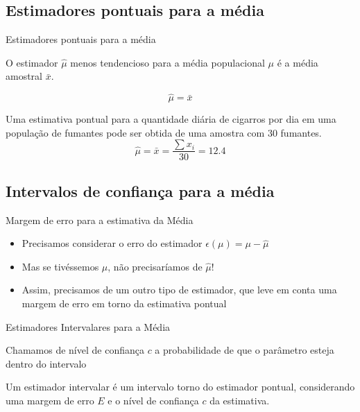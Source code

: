 \documentclass{beamer}
\begin{document}
\subsection{Estimadores pontuais para a média}

\begin{frame}{Estimadores pontuais para a média}
  \begin{block}{}
    O estimador $\hat{\mu}$ menos tendencioso para a média
    populacional $\mu$ é a média amostral $\bar{x}$.
  \end{block}
  \begin{displaymath}
    \hat{\mu} = \bar{x}
  \end{displaymath}
\end{frame}

\begin{frame}
  \begin{example}
    Uma estimativa pontual para a quantidade diária de cigarros por
    dia em uma população de fumantes pode ser obtida de uma amostra
    com 30 fumantes.
    \begin{displaymath}
      \hat{\mu} = \bar{x} = \frac{\sum x_i}{30} = 12.4
    \end{displaymath}
  \end{example}
\end{frame}

\subsection{Intervalos de confiança para a média}
\begin{frame}{Margem de erro para a estimativa da Média}
  \begin{itemize}
  \item Precisamos considerar o erro do estimador $\epsilon(\mu) =
    \mu - \hat{\mu}$
  \item Mas se tivéssemos $\mu$, não precisaríamos de $\hat{\mu}$!
  \item Assim, precisamos de um outro tipo de estimador, que leve em
    conta uma margem de erro em torno da estimativa pontual
  \end{itemize}
\end{frame}

\begin{frame}{Estimadores Intervalares para a Média}
  \begin{definition}
    Chamamos de \alert{nível de confiança} $c$ a probabilidade de que
    o parâmetro esteja dentro do intervalo
  \end{definition}
  \begin{definition}
    Um \alert{estimador intervalar} é um intervalo torno do estimador
    pontual, considerando uma \alert{margem de erro} $E$ e o nível de
    confiança $c$ da estimativa.
  \end{definition}
\end{frame}
\end{document}
